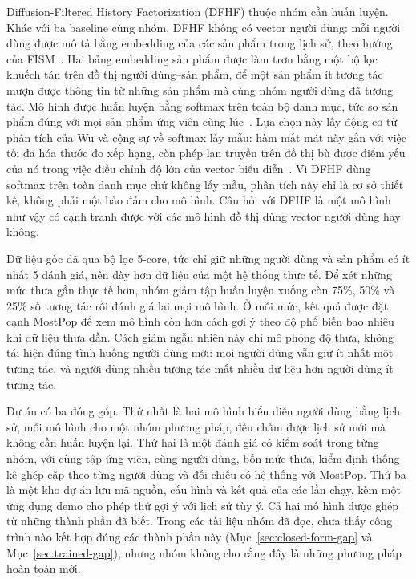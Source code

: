 Diffusion-Filtered History Factorization (DFHF) thuộc nhóm cần huấn luyện. Khác với ba baseline cùng nhóm, DFHF không có vector người dùng: mỗi người dùng được mô tả bằng embedding của các sản phẩm trong lịch sử, theo hướng của FISM~\cite{kabbur2013fism}. Hai bảng embedding sản phẩm được làm trơn bằng một bộ lọc khuếch tán trên đồ thị người dùng--sản phẩm, để một sản phẩm ít tương tác mượn được thông tin từ những sản phẩm mà cùng nhóm người dùng đã tương tác. Mô hình được huấn luyện bằng softmax trên toàn bộ danh mục, tức so sản phẩm đúng với mọi sản phẩm ứng viên cùng lúc~\cite{liang2018multvae}. Lựa chọn này lấy động cơ từ phân tích của Wu và cộng sự về softmax lấy mẫu: hàm mất mát này gắn với việc tối đa hóa thước đo xếp hạng, còn phép lan truyền trên đồ thị bù được điểm yếu của nó trong việc điều chỉnh độ lớn của vector biểu diễn~\cite{wu2024sampledsoftmax}. Vì DFHF dùng softmax trên toàn danh mục chứ không lấy mẫu, phân tích này chỉ là cơ sở thiết kế, không phải một bảo đảm cho mô hình. Câu hỏi với DFHF là một mô hình như vậy có cạnh tranh được với các mô hình đồ thị dùng vector người dùng hay không.

Dữ liệu gốc đã qua bộ lọc 5-core, tức chỉ giữ những người dùng và sản phẩm có ít nhất 5 đánh giá, nên dày hơn dữ liệu của một hệ thống thực tế. Để xét những mức thưa gần thực tế hơn, nhóm giảm tập huấn luyện xuống còn 75\%, 50\% và 25\% số tương tác rồi đánh giá lại mọi mô hình. Ở mỗi mức, kết quả được đặt cạnh MostPop để xem mô hình còn hơn cách gợi ý theo độ phổ biến bao nhiêu khi dữ liệu thưa dần. Cách giảm ngẫu nhiên này chỉ mô phỏng độ thưa, không tái hiện đúng tình huống người dùng mới: mọi người dùng vẫn giữ ít nhất một tương tác, và người dùng nhiều tương tác mất nhiều dữ liệu hơn người dùng ít tương tác.

Dự án có ba đóng góp. Thứ nhất là hai mô hình biểu diễn người dùng bằng lịch sử, mỗi mô hình cho một nhóm phương pháp, đều chấm được lịch sử mới mà không cần huấn luyện lại. Thứ hai là một đánh giá có kiểm soát trong từng nhóm, với cùng tập ứng viên, cùng người dùng, bốn mức thưa, kiểm định thống kê ghép cặp theo từng người dùng và đối chiếu có hệ thống với MostPop. Thứ ba là một kho dự án lưu mã nguồn, cấu hình và kết quả của các lần chạy, kèm một ứng dụng demo cho phép thử gợi ý với lịch sử tùy ý. Cả hai mô hình được ghép từ những thành phần đã biết. Trong các tài liệu nhóm đã đọc, chưa thấy công trình nào kết hợp đúng các thành phần này (Mục~\ref{sec:closed-form-gap} và Mục~\ref{sec:trained-gap}), nhưng nhóm không cho rằng đây là những phương pháp hoàn toàn mới.

